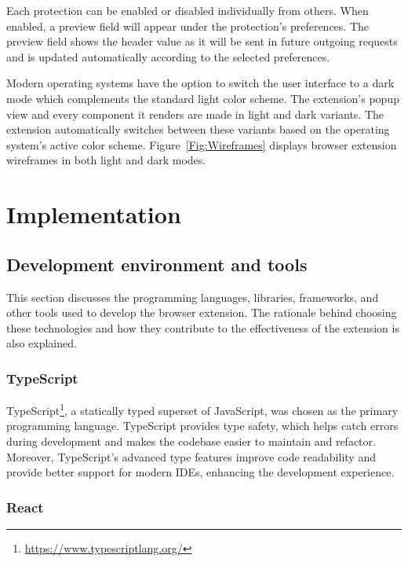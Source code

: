 Each protection can be enabled or disabled individually from others. When enabled, a preview field will appear under the protection's preferences. The preview field shows the header value as it will be sent in future outgoing requests and is updated automatically according to the selected preferences.

Modern operating systems have the option to switch the user interface to a dark mode which complements the standard light color scheme. The extension's popup view and every component it renders are made in light and dark variants. The extension automatically switches between these variants based on the operating system's active color scheme. Figure~\ref{Fig:Wireframes} displays browser extension wireframes in both light and dark modes.


\chapter{Implementation}


\section{Development environment and tools}

This section discusses the programming languages, libraries, frameworks, and other tools used to develop the browser extension. The rationale behind choosing these technologies and how they contribute to the effectiveness of the extension is also explained.

\subsection{TypeScript}

TypeScript\footnote{\url{https://www.typescriptlang.org/}}, a statically typed superset of JavaScript, was chosen as the primary programming language. TypeScript provides type safety, which helps catch errors during development and makes the codebase easier to maintain and refactor. Moreover, TypeScript's advanced type features improve code readability and provide better support for modern IDEs, enhancing the development experience.

\subsection{React}

